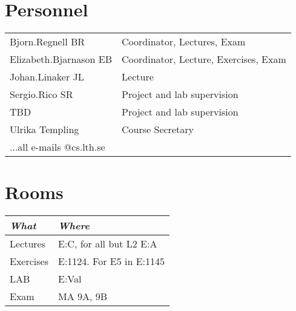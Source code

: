 \section{Personnel}
\begin{flushleft}
	\setlength{\tabcolsep}{0pt}
	\begin{tabular}{p{} p{}}
		Bjorn.Regnell BR & Coordinator, Lectures, Exam \\
		Elizabeth.Bjarnason EB & Coordinator, Lecture, Exercises, Exam \\
		Johan.Linaker JL & Lecture \\
		Sergio.Rico SR & Project and lab supervision \\
		TBD & Project and lab supervision \\
		Ulrika Templing & Course Secretary \\
		...all e-mails @cs.lth.se
	\end{tabular}
\end{flushleft}

\section{Rooms}
\begin{flushleft}
\small
\begin{tabular}{l | l } 
{\it What} & {\it Where} \\
\hline
Lectures & E:C, for all but L2 E:A \\
Exercises & E:1124. For E5 in E:1145 \\
LAB& E:Val\\
Exam & MA 9A, 9B \\
\end{tabular}
\end{flushleft}
